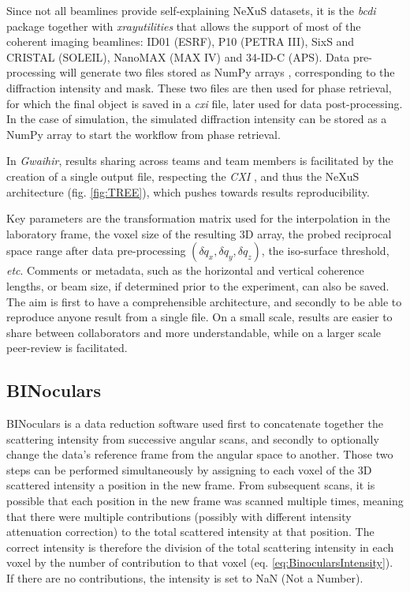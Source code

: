 Since not all beamlines provide self-explaining NeXuS datasets, it is the \textit{bcdi} package together with \textit{xrayutilities} \cite{kriegner_xrayutilities_2013} that allows the support of most of the coherent imaging beamlines: ID01 (ESRF), P10 (PETRA III), SixS and CRISTAL (SOLEIL), NanoMAX (MAX IV) and 34-ID-C (APS).
Data pre-processing will generate two files stored as NumPy arrays \cite{NumPy}, corresponding to the diffraction intensity and mask.
These two files are then used for phase retrieval, for which the final object is saved in a \textit{cxi} file, later used for data post-processing.
In the case of simulation, the simulated diffraction intensity can be stored as a NumPy array to start the workflow from phase retrieval.

In \textit{Gwaihir}, results sharing across teams and team members is facilitated by the creation of a single output file, respecting the \textit{CXI} \cite{Maia2012}, and thus the NeXuS \cite{Konnecke2015} architecture (fig. \ref{fig:TREE}), which pushes towards results reproducibility.

Key parameters are the transformation matrix used for the interpolation in the laboratory frame, the voxel size of the resulting 3D array, the probed reciprocal space range after data pre-processing $(\delta q_x , \delta q_y , \delta q_z)$, the iso-surface threshold, \textit{etc}.
Comments or metadata, such as the horizontal and vertical coherence lengths, or beam size, if determined prior to the experiment, can also be saved.
The aim is first to have a comprehensible architecture, and secondly to be able to reproduce anyone result from a single file.
On a small scale, results are easier to share between collaborators and more understandable, while on a larger scale peer-review is facilitated.

\subsection{BINoculars} \label{sec:BINoculars}

BINoculars \parencite{Roobol2015} is a data reduction software used first to concatenate together the scattering intensity from successive angular scans, and secondly to optionally change the data's reference frame from the angular space to another.
Those two steps can be performed simultaneously by assigning to each voxel of the 3D scattered intensity a position in the new frame.
From subsequent scans, it is possible that each position in the new frame was scanned multiple times, meaning that there were multiple contributions (possibly with different intensity attenuation correction) to the total scattered intensity at that position.
The correct intensity is therefore the division of the total scattering intensity in each voxel by the number of contribution to that voxel (eq. \ref{eq:BinocularsIntensity}).
If there are no contributions, the intensity is set to NaN (Not a Number).

